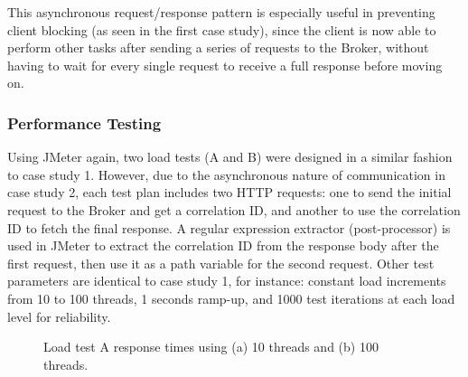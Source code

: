 This asynchronous request/response pattern is especially useful in preventing client blocking (as seen in the first case study), since the client is now able to perform other tasks after sending a series of requests to the Broker, without having to wait for every single request to receive a full response before moving on.


\subsubsection{Performance Testing}

Using JMeter again, two load tests (A and B) were designed in a similar fashion to case study 1. However, due to the asynchronous nature of communication in case study 2, each test plan includes two HTTP requests: one to send the initial request to the Broker and get a correlation ID, and another to use the correlation ID to fetch the final response. A regular expression extractor (post-processor) is used in JMeter to extract the correlation ID from the response body after the first request, then use it as a path variable for the second request. Other test parameters are identical to case study 1, for instance: constant load increments from 10 to 100 threads, 1 seconds ramp-up, and 1000 test iterations at each load level for reliability.

\begin{figure}[H]
  \centering
  \caption{Load test A response times using (a) 10 threads and (b) 100 threads.}
  \label{fig:cs02-lta-12}
\end{figure}

